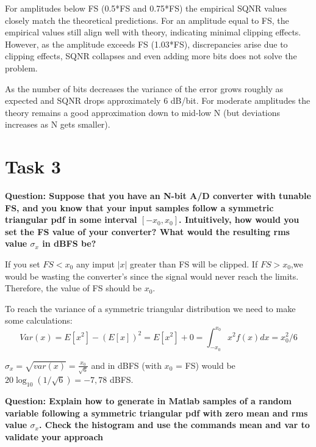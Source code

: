 \documentclass[11pt,a4paper]{article}
\begin{document}
For amplitudes below FS (0.5*FS and 0.75*FS) the empirical SQNR values closely match the theoretical predictions.
For an amplitude equal to FS, the empirical values still align well with theory, indicating minimal clipping effects.
However, as the amplitude exceeds FS (1.03*FS), discrepancies arise due to clipping effects, SQNR collapses and even adding more bits does not solve the problem.

As the number of bits decreases the variance of the error grows roughly as expected and SQNR drops approximately 6 dB/bit.
For moderate amplitudes the theory remains a good approximation down to mid-low N (but deviations increases as N gets smaller).

\section{Task 3}
\textbf{Question: Suppose that you have an N-bit A/D converter with tunable FS, and you know that your input samples follow
    a symmetric triangular pdf in some interval $[-x_0,x_0]$. Intuitively, how would you set the FS value of your converter?
    What would the resulting rms value $\sigma_x$ in dBFS be?
}

\vspace{0.5cm}
If you set $FS < x_0$ any imput $|x|$ greater than FS will be clipped. If $FS > x_0$,we would be wasting the converter's since the signal would never
reach the limits. Therefore, the value of FS should be $x_0$.

To reach the variance of a symmetric triangular distribution we need to make some calculations:
\[
    Var(x) = E[x^2] - (E[x])^2 = E[x^2] + 0 = \int_{-x_0}^{x_0} x^2 f(x) dx = x_0^2/6
\]

$\sigma_x = \sqrt{var(x)} = \frac{x_0}{\sqrt{6}}$ and in dBFS (with $x_0$ = FS) would be $20\log_{10}(1/\sqrt{6}) = -7,78$ dBFS.

\vspace{1cm}
\textbf{Question: Explain how to generate in Matlab samples of a random variable following a symmetric triangular pdf with
    zero mean and rms value $\sigma_x$. Check the histogram and use the commands mean and var to validate your approach
}
\end{document}
